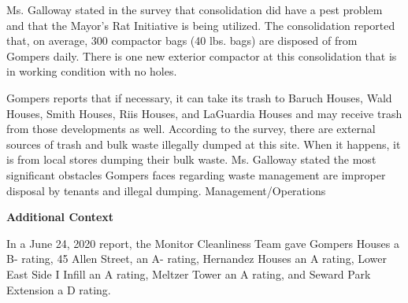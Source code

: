  

Ms. Galloway stated in the survey that consolidation did have a pest problem and that the Mayor's Rat Initiative is being utilized. The consolidation reported that, on average, 300 compactor bags (40 lbs. bags)  are disposed of from Gompers daily. There is one new exterior compactor at this consolidation that is in working condition with no holes. 

Gompers reports that if necessary, it can take its trash to Baruch Houses, Wald Houses, Smith Houses, Riis Houses, and LaGuardia Houses and may receive trash from those developments as well. According to the survey, there are external sources of trash and bulk waste illegally dumped at this site.  When it happens, it is from local stores dumping their bulk waste. Ms. Galloway stated the most significant obstacles Gompers faces regarding waste management are improper disposal by tenants and illegal dumping. Management/Operations

\textbf{Additional Context}  

In a June 24, 2020 report, the Monitor Cleanliness Team gave Gompers Houses a B- rating, 45 Allen Street, an A- rating, Hernandez Houses an A rating, Lower East Side I Infill an A rating, Meltzer Tower an A rating, and Seward Park Extension a D rating.  